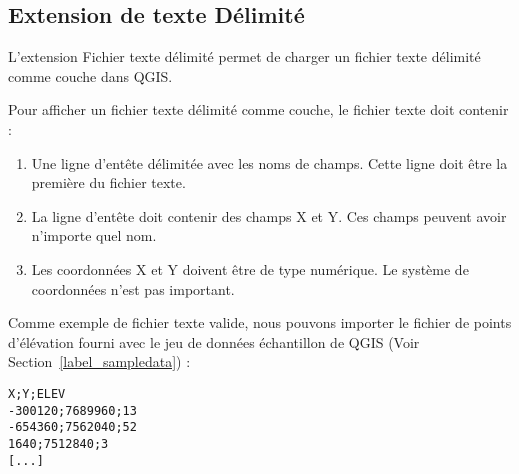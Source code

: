 
\subsection{Extension de texte D\'elimit\'e}\label{label_dltext}    


L'extension Fichier texte d\'elimit\'e permet de charger un fichier texte d\'elimit\'e comme couche dans QGIS.


Pour afficher un fichier texte d\'elimit\'e comme couche, le fichier texte doit contenir :

\begin{enumerate}      
\item Une ligne d'ent\^ete d\'elimit\'ee avec les noms de champs. Cette ligne doit \^etre la premi\`ere du fichier texte.
\item La ligne d'ent\^ete doit contenir des champs X et Y. Ces champs peuvent avoir n'importe quel nom.
\item Les coordonn\'ees X et Y doivent \^etre de type num\'erique. Le syst\`eme de coordonn\'ees n'est pas important.
\end{enumerate}

Comme exemple de fichier texte valide, nous pouvons importer le fichier de points d'\'el\'evation
 fourni avec le jeu de donn\'ees \'echantillon de QGIS (Voir Section~\ref{label_sampledata}) :

\begin{verbatim} 
X;Y;ELEV
-300120;7689960;13
-654360;7562040;52
1640;7512840;3
[...]
\end{verbatim}


